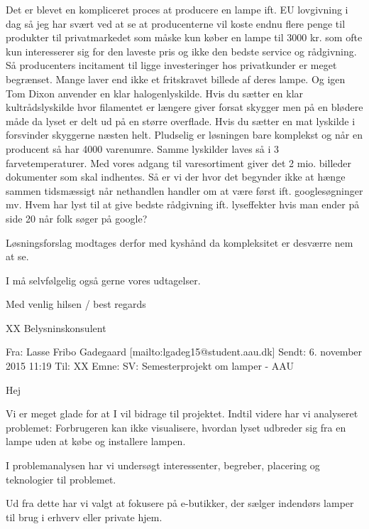 Det er blevet en kompliceret proces at producere en lampe ift. EU lovgivning i dag så jeg har svært ved at se at producenterne vil koste endnu flere penge til produkter til privatmarkedet som måske kun køber en lampe til 3000 kr. som ofte kun interesserer sig for den laveste pris og ikke den bedste service og rådgivning. Så producenters incitament til ligge investeringer hos privatkunder er meget begrænset. Mange laver end ikke et fritskravet billede af deres lampe. Og igen Tom Dixon anvender en klar halogenlyskilde. Hvis du sætter en klar kultrådslyskilde hvor filamentet er længere giver forsat skygger men på en blødere måde da lyset er delt ud på en større overflade. Hvis du sætter en mat lyskilde i forsvinder skyggerne næsten helt. Pludselig er løsningen bare komplekst og når en producent så har 4000 varenumre. Samme lyskilder laves så i 3 farvetemperaturer. Med vores adgang til varesortiment giver det 2 mio. billeder dokumenter som skal indhentes. Så er vi der hvor det begynder ikke at hænge sammen tidsmæssigt når nethandlen handler om at være først ift. googlesøgninger mv. Hvem har lyst til at give bedste rådgivning ift. lyseffekter hvis man ender på side 20 når folk søger på google?  

Løsningsforslag modtages derfor med kyshånd da kompleksitet er desværre nem at se. 

I må selvfølgelig også gerne vores udtagelser.  

Med venlig hilsen / best regards

XX\newline
Belysninskonsulent

\noindent\makebox[\linewidth]{\rule{\paperwidth}{0.4pt}}

Fra: Lasse Fribo Gadegaard [mailto:lgadeg15@student.aau.dk] \newline
Sendt: 6. november 2015 11:19\newline
Til: XX\newline
Emne: SV: Semesterprojekt om lamper - AAU

Hej 
 
Vi er meget glade for at I vil bidrage til projektet. Indtil videre har vi analyseret problemet: 
Forbrugeren kan ikke visualisere, hvordan lyset udbreder sig fra en lampe uden at købe og installere lampen. 

I problemanalysen har vi undersøgt interessenter, begreber, placering og teknologier til problemet. 

Ud fra dette har vi valgt at fokusere på e-butikker, der sælger indendørs lamper til brug i erhverv eller private hjem. 

